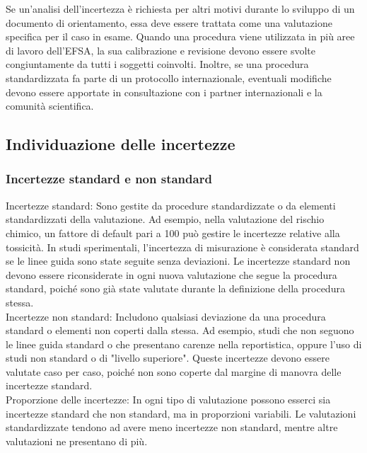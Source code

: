 Se un'analisi dell'incertezza è richiesta per altri motivi durante lo sviluppo di un documento di orientamento, essa deve essere trattata come una valutazione specifica per il caso in esame. Quando una procedura viene utilizzata in più aree di lavoro dell'EFSA, la sua calibrazione e revisione devono essere svolte congiuntamente da tutti i soggetti coinvolti. Inoltre, se una procedura standardizzata fa parte di un protocollo internazionale, eventuali modifiche devono essere apportate in consultazione con i partner internazionali e la comunità scientifica.\\

\subsection{Individuazione delle incertezze}

\subsubsection{Incertezze standard e non standard}

Incertezze standard: Sono gestite da procedure standardizzate o da elementi standardizzati della valutazione. Ad esempio, nella valutazione del rischio chimico, un fattore di default pari a 100 può gestire le incertezze relative alla tossicità. In studi sperimentali, l'incertezza di misurazione è considerata standard se le linee guida sono state seguite senza deviazioni. Le incertezze standard non devono essere riconsiderate in ogni nuova valutazione che segue la procedura standard, poiché sono già state valutate durante la definizione della procedura stessa.\\

Incertezze non standard: Includono qualsiasi deviazione da una procedura standard o elementi non coperti dalla stessa. Ad esempio, studi che non seguono le linee guida standard o che presentano carenze nella reportistica, oppure l'uso di studi non standard o di "livello superiore". Queste incertezze devono essere valutate caso per caso, poiché non sono coperte dal margine di manovra delle incertezze standard.\\

Proporzione delle incertezze: In ogni tipo di valutazione possono esserci sia incertezze standard che non standard, ma in proporzioni variabili. Le valutazioni standardizzate tendono ad avere meno incertezze non standard, mentre altre valutazioni ne presentano di più.



